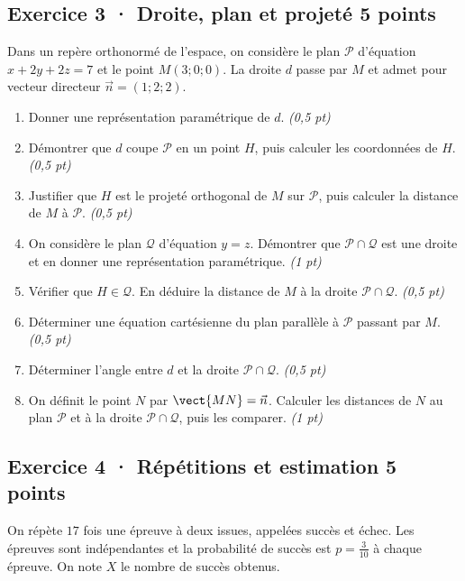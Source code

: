 \subsection*{Exercice 3 · Droite, plan et projeté \hfill 5 points}Dans un repère orthonormé de l'espace, on considère le plan $\mathcal P$ d'équation $x+2y+2z=7$ et le point $M(3;0;0)$. La droite $d$ passe par $M$ et admet pour vecteur directeur $\vec n=(1;2;2)$.

\begin{enumerate}

\item Donner une représentation paramétrique de $d$. \hfill\textit{(0,5 pt)}

\item Démontrer que $d$ coupe $\mathcal P$ en un point $H$, puis calculer les coordonnées de $H$. \hfill\textit{(0,5 pt)}

\item Justifier que $H$ est le projeté orthogonal de $M$ sur $\mathcal P$, puis calculer la distance de $M$ à $\mathcal P$. \hfill\textit{(0,5 pt)}

\item On considère le plan $\mathcal Q$ d'équation $y=z$. Démontrer que $\mathcal P\cap\mathcal Q$ est une droite et en donner une représentation paramétrique. \hfill\textit{(1 pt)}

\item Vérifier que $H\in\mathcal Q$. En déduire la distance de $M$ à la droite $\mathcal P\cap\mathcal Q$. \hfill\textit{(0,5 pt)}

\item Déterminer une équation cartésienne du plan parallèle à $\mathcal P$ passant par $M$. \hfill\textit{(0,5 pt)}

\item Déterminer l'angle entre $d$ et la droite $\mathcal P\cap\mathcal Q$. \hfill\textit{(0,5 pt)}

\item On définit le point $N$ par $\vect{MN}=\vec n$. Calculer les distances de $N$ au plan $\mathcal P$ et à la droite $\mathcal P\cap\mathcal Q$, puis les comparer. \hfill\textit{(1 pt)}

\end{enumerate}

\subsection*{Exercice 4 · Répétitions et estimation \hfill 5 points}On répète $17$ fois une épreuve à deux issues, appelées succès et échec. Les épreuves sont indépendantes et la probabilité de succès est $p=\frac{3}{10}$ à chaque épreuve. On note $X$ le nombre de succès obtenus.

